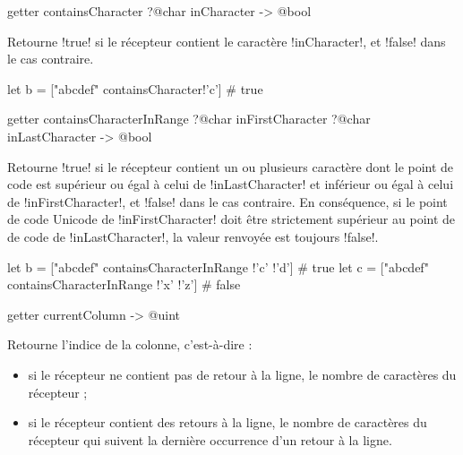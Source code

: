 
\begin{galgasbox}
getter containsCharacter ?@char inCharacter -> @bool
\end{galgasbox}
Retourne \ggs!true! si le récepteur contient le caractère \ggs!inCharacter!, et \ggs!false! dans le cas contraire.

\begin{galgas}
let b = ["abcdef" containsCharacter!'c'] # true
\end{galgas}






\begin{galgasbox}
getter containsCharacterInRange
  ?@char inFirstCharacter
  ?@char inLastCharacter
  -> @bool
\end{galgasbox}

Retourne \ggs!true! si le récepteur contient un ou plusieurs caractère dont le point de code est supérieur ou égal à celui de \ggs!inLastCharacter! et inférieur ou égal à celui de \ggs!inFirstCharacter!, et \ggs!false! dans le cas contraire. En conséquence, si le point de code Unicode de \ggs!inFirstCharacter! doit être strictement supérieur au point de de code de \ggs!inLastCharacter!, la valeur renvoyée est toujours \ggs!false!.

\begin{galgas}
let b = ["abcdef" containsCharacterInRange !'c' !'d'] # true
let c = ["abcdef" containsCharacterInRange !'x' !'z'] # false
\end{galgas}







\begin{galgasbox}
getter currentColumn -> @uint
\end{galgasbox}

Retourne l'indice de la colonne, c'est-à-dire :
\begin{itemize}
\item si le récepteur ne contient pas de retour à la ligne, le nombre de caractères du récepteur ;
\item si le récepteur contient des retours à la ligne, le nombre de caractères du récepteur qui suivent la dernière occurrence d'un retour à la ligne.
\end{itemize}







